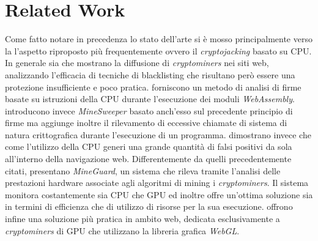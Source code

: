 \documentclass[
11pt, %
oneside, %
english, %
onehalfspacing,%
headsepline, %
]{MastersDoctoralThesis} %
\newcommand\citen[1]{\citeauthor{#1} \cite{#1}}
\begin{document}
{\let\clearpage\relax \chapter{Related Work}}
Come fatto notare in precedenza lo stato dell'arte si è mosso principalmente verso la l'aspetto riproposto più frequentemente ovvero il \emph{cryptojacking} basato su CPU. In generale sia \citen{musch2018web} che \citen{saad2018end} mostrano la diffusione di \emph{cryptominers} nei siti web, analizzando l'efficacia di tecniche di blacklisting che risultano però essere una protezione insufficiente e poco pratica. \citen{wang2018seismic} forniscono un metodo di analisi di firme basate su istruzioni della CPU durante l'esecuzione dei moduli \emph{WebAssembly}. \citen{konoth2018minesweeper} introducono invece \emph{MineSweeper} basato anch'esso sul precedente principio di firme ma aggiunge inoltre il rilevamento di eccessive chiamate di sistema di natura crittografica durante l'esecuzione di un programma. \citen{kharraz2019outguard} dimostrano invece che come l'utilizzo della CPU generi una grande quantità di falsi positivi da sola all'interno della navigazione web. Differentemente da quelli precedentemente citati, \citen{tahir2017mining} presentano \emph{MineGuard}, un sistema che rileva tramite l'analisi delle prestazioni hardware associate agli algoritmi di mining i \emph{cryptominers}. Il sistema monitora costantemente sia CPU che GPU ed inoltre offre un'ottima soluzione sia in termini di efficienza che di utilizzo di risorse per la sua esecuzione. \citen{belkin2019risks} offrono infine una soluzione più pratica in ambito web, dedicata esclusivamente a \emph{cryptominers} di GPU che utilizzano la libreria grafica \emph{WebGL}.
\end{document}
